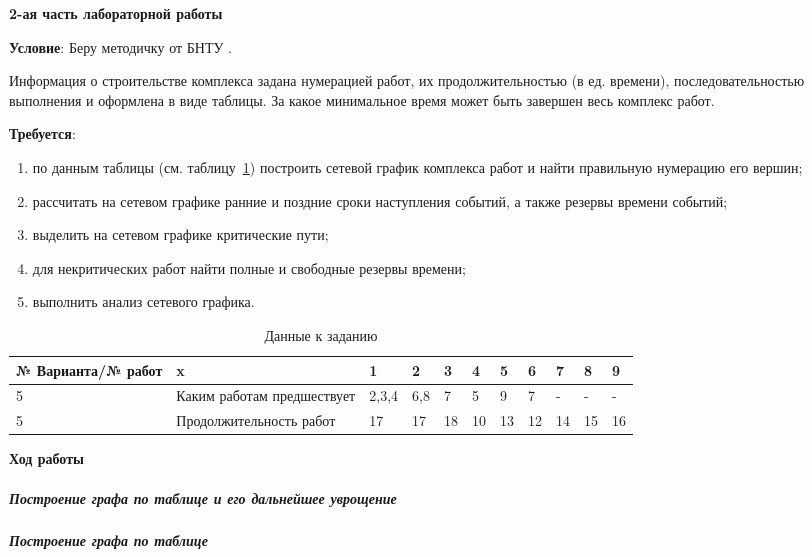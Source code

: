 \begin{center}
  \textbf{2-ая часть лабораторной работы}
\end{center}

\textbf{Условие}: Беру методичку от БНТУ \cite{MethodBntu}.

Информация о строительстве комплекса задана нумерацией работ,
их продолжительностью (в ед. времени),
последовательностью выполнения и оформлена в виде таблицы.
За какое минимальное время может быть завершен весь комплекс работ.

\textbf{Требуется}:
\begin{enumerate}
  \item[1)] по данным таблицы (см. таблицу~\ref{tab:part2_option5}) построить сетевой график комплекса работ и найти правильную нумерацию его вершин;
  \item[2)] рассчитать на сетевом графике ранние и поздние сроки наступления событий, а также резервы времени событий;
  \item[3)] выделить на сетевом графике критические пути;
  \item[4)] для некритических работ найти полные и свободные резервы времени;
  \item[5)] выполнить анализ сетевого графика.
\end{enumerate}

\begin{table}[h!]
  \centering

  \scriptsize

  \caption{Данные к заданию}
  \label{tab:part2_option5}

  \begin{tabular}{|l|l|l|l|l|l|l|l|l|l|l|} 
    \hline
    № Варианта/№ работ &x&1&2&3&4&5&6&7&8&9\\  \hline
    5&Каким работам предшествует&2,3,4&6,8&7&5&9&7&-&-&-\\ \hline
    5&Продолжительность работ&17&17&18&10&13&12&14&15&16\\  \hline
  \end{tabular}
\end{table}

\newpage

\begin{center}
  \textbf{Ход работы}
\end{center}

\subparagraph{Построение графа по таблице и его дальнейшее уврощение} \hspace{0pt}

\subparagraph{Построение графа по таблице} \hspace{0pt}

